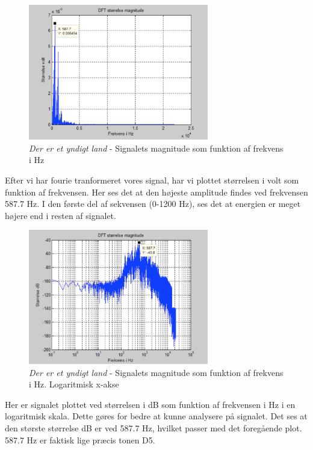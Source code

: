 \begin{figure}[H]
	\centering
	\includegraphics[width=0.7\textwidth]{Figurer/Nationalsang2}
	\caption{\textit{Der er et yndigt land} - Signalets magnitude som funktion af frekvens i Hz}
\end{figure}

Efter vi har fourie tranformeret vores signal, har vi plottet størrelsen i volt som funktion af frekvensen. Her ses det at den højeste amplitude findes ved frekvensen 587.7 Hz. I den første del af sekvensen (0-1200 Hz), ses det at energien er meget højere end i resten af signalet. 

\begin{figure}[H]
	\centering
	\includegraphics[width=0.7\textwidth]{Figurer/Nationalsang3}
	\caption{\textit{Der er et yndigt land} - Signalets magnitude som funktion af frekvens i Hz. Logaritmisk x-akse}
\end{figure}

Her er signalet plottet ved størrelsen i dB som funktion af frekvensen i Hz i en logaritmisk skala. Dette gøres for bedre at kunne analysere på signalet. Det ses at den største størrelse dB er ved 587.7 Hz, hvilket passer med det foregående plot. 587.7 Hz er faktisk lige præcis tonen D5. 

